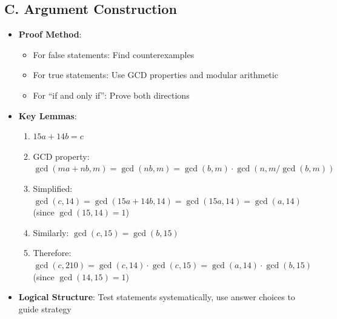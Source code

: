 \documentclass[12pt]{article}
\begin{document}
\begin{strategicbox}
\subsection*{C. Argument Construction}
\begin{itemize}[leftmargin=*]
    \item \textbf{Proof Method}: 
    \begin{itemize}
        \item For false statements: Find counterexamples
        \item For true statements: Use GCD properties and modular arithmetic
        \item For ``if and only if'': Prove both directions
    \end{itemize}
    \item \textbf{Key Lemmas}: 
    \begin{enumerate}
        \item $15a + 14b = c$
        \item GCD property: $\gcd(ma + nb, m) = \gcd(nb, m) = \gcd(b, m) \cdot \gcd(n, m/\gcd(b,m))$
        \item Simplified: $\gcd(c, 14) = \gcd(15a + 14b, 14) = \gcd(15a, 14) = \gcd(a, 14)$ (since $\gcd(15,14)=1$)
        \item Similarly: $\gcd(c, 15) = \gcd(b, 15)$
        \item Therefore: $\gcd(c, 210) = \gcd(c, 14) \cdot \gcd(c, 15) = \gcd(a, 14) \cdot \gcd(b, 15)$ (since $\gcd(14,15)=1$)
    \end{enumerate}
    \item \textbf{Logical Structure}: Test statements systematically, use answer choices to guide strategy
\end{itemize}
\end{strategicbox}
\end{document}

